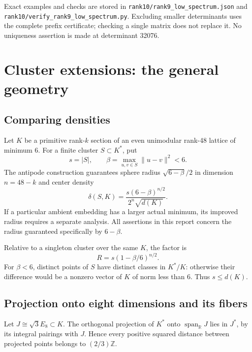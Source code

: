 \documentclass[11pt,a4paper]{article}
\theoremstyle{remark}\newtheorem{remark}[theorem]{Remark}
\newcommand{\Z}{\mathbb Z}\newcommand{\R}{\mathbb R}\newcommand{\F}{\mathbb F}
\newcommand{\spanR}{\operatorname{span}_{\R}}\newcommand{\diag}{\operatorname{diag}}
\newcommand{\file}[1]{{\small\nolinkurl{#1}}}
\begin{document}
Exact examples and checks are stored in \file{rank10/rank9_low_spectrum.json} and \file{rank10/verify_rank9_low_spectrum.py}. Excluding smaller determinants uses the complete prefix certificate; checking a single matrix does not replace it. No uniqueness assertion is made at determinant 32076.


\section{Cluster extensions: the general geometry}

\subsection{Comparing densities}

Let $K$ be a primitive rank-$k$ section of an even unimodular rank-48 lattice of minimum 6. For a finite cluster $S\subset K^*$, put
\[
s=|S|,\qquad\beta=\max_{u,v\in S}\|u-v\|^2<6.
\]
The antipode construction guarantees sphere radius $\sqrt{6-\beta}/2$ in dimension $n=48-k$ and center density
\begin{equation}\label{eq:density}
\delta(S,K)=\frac{s(6-\beta)^{n/2}}{2^n\sqrt{d(K)}}.
\end{equation}
If a particular ambient embedding has a larger actual minimum, its improved radius requires a separate analysis. All assertions in this report concern the radius guaranteed specifically by $6-\beta$.

Relative to a singleton cluster over the same $K$, the factor is
\begin{equation}\label{eq:ratio}
R=s(1-\beta/6)^{n/2}.
\end{equation}
For $\beta<6$, distinct points of $S$ have distinct classes in $K^*/K$: otherwise their difference would be a nonzero vector of $K$ of norm less than 6. Thus $s\le d(K)$.

\subsection{Projection onto eight dimensions and its fibers}

Let $J\cong\sqrt3E_8\subset K$. The orthogonal projection of $K^*$ onto $\spanR J$ lies in $J^*$, by its integral pairings with $J$. Hence every positive squared distance between projected points belongs to $(2/3)\Z$.
\end{document}

